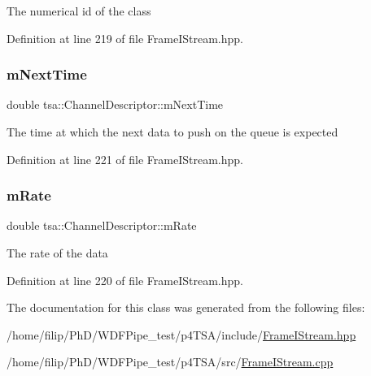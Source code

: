 The numerical id of the class 

Definition at line 219 of file Frame\+I\+Stream.\+hpp.

\mbox{\label{classtsa_1_1_channel_descriptor_a6bad409238df7dff8b5265570adac8ff}} 
\subsubsection{\texorpdfstring{m\+Next\+Time}{mNextTime}}
{\footnotesize\ttfamily double tsa\+::\+Channel\+Descriptor\+::m\+Next\+Time\hspace{0.3cm}{\ttfamily [protected]}}

The time at which the next data to push on the queue is expected 

Definition at line 221 of file Frame\+I\+Stream.\+hpp.

\mbox{\label{classtsa_1_1_channel_descriptor_a142c7f60e14fa8036340b902529cf956}} 
\subsubsection{\texorpdfstring{m\+Rate}{mRate}}
{\footnotesize\ttfamily double tsa\+::\+Channel\+Descriptor\+::m\+Rate\hspace{0.3cm}{\ttfamily [protected]}}

The rate of the data 

Definition at line 220 of file Frame\+I\+Stream.\+hpp.



The documentation for this class was generated from the following files\+:\begin{DoxyCompactItemize}
\item 
/home/filip/\+Ph\+D/\+W\+D\+F\+Pipe\+\_\+test/p4\+T\+S\+A/include/\hyperlink{_frame_i_stream_8hpp}{Frame\+I\+Stream.\+hpp}\item 
/home/filip/\+Ph\+D/\+W\+D\+F\+Pipe\+\_\+test/p4\+T\+S\+A/src/\hyperlink{_frame_i_stream_8cpp}{Frame\+I\+Stream.\+cpp}\end{DoxyCompactItemize}
